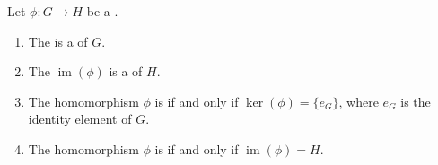 \begin{proposition} \label{proposition:basic_facts_about_kernel_and_image_of_group_homomorphisms}
    Let $\phi : G \to H$ be a .
    \begin{enumerate}
        \item The  is a  of $G$.
        \item\label{item:image_of_group_homomoprhism_is_subgroup_of_codomain} The  $\operatorname{im}(\phi)$ is a  of $H$.
        \item\label{item:group_hom_is_injective_iff_kernel_is_trivial} The homomorphism $\phi$ is  if and only if $\operatorname{ker}(\phi) = \{e_G\}$, where $e_G$ is the identity element of $G$.
        \item The homomorphism $\phi$ is  if and only if $\operatorname{im}(\phi) = H$.
    \end{enumerate}
\end{proposition}
